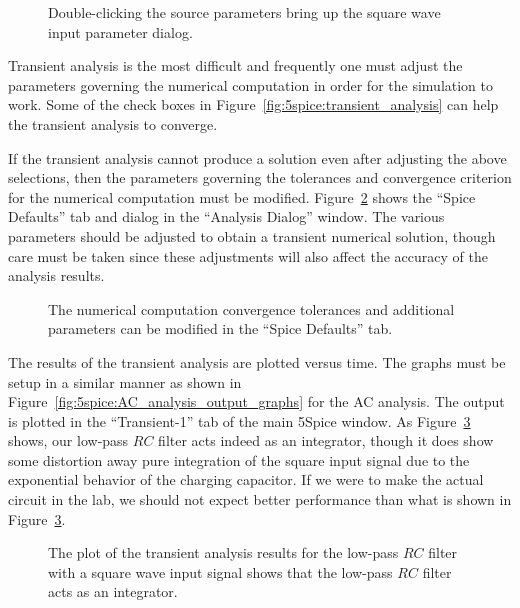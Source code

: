 \documentclass{article}
\begin{document}
\begin{figure}
\begin{center}
\end{center}
\caption{Double-clicking the source parameters bring up the square wave input parameter dialog.}
\label{fig:5spice:transient_analysis_square_wave}
\end{figure}

Transient analysis is the most difficult and frequently one must adjust the parameters governing the numerical computation in order for the simulation to work. Some of the check boxes in Figure~\ref{fig:5spice:transient_analysis} can help the transient analysis to converge.

If the transient analysis cannot produce a solution even after adjusting the above selections, then the parameters governing the tolerances and convergence criterion for the numerical computation must be modified.  Figure~\ref{fig:5spice:numerical_tolerances} shows the ``Spice Defaults'' tab and dialog in the ``Analysis Dialog'' window. The various parameters should be adjusted to obtain a transient numerical solution, though care must be taken since these adjustments will also affect the accuracy of the analysis results.  

\begin{figure}
\begin{center}
\end{center}
\caption{The numerical computation convergence tolerances and additional parameters can be modified in the ``Spice Defaults'' tab.}
\label{fig:5spice:numerical_tolerances}
\end{figure}

The results of the transient analysis are plotted versus time. The graphs must be setup in a similar manner as shown in Figure~\ref{fig:5spice:AC_analysis_output_graphs} for the AC analysis.  The output is plotted in the ``Transient-1'' tab of the main 5Spice window. As Figure~\ref{fig:5spice:transient_results} shows, our low-pass $RC$ filter acts indeed as an integrator, though it does show some distortion away pure integration of the square input signal due to the exponential behavior of the charging capacitor. If we were to make the actual circuit in the lab, we should not expect better performance than what is shown in Figure~\ref{fig:5spice:transient_results}.

\begin{figure}
\begin{center}
\end{center}
\caption{The plot of the transient analysis results for the low-pass $RC$ filter with a square wave input signal shows that the low-pass $RC$ filter acts as an integrator.}
\label{fig:5spice:transient_results}
\end{figure}
\end{document}
